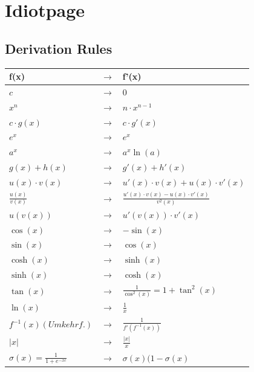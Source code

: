 \section{Idiotpage}
\subsection{Derivation Rules}

{\setlength{\extrarowheight}{4pt}
	\begin{tabular}{@{}lcl@{}}
		\textbf{f(x)} & $\rightarrow$ & \textbf{f'(x)} \\
		\toprule
		$c$ & $\rightarrow$ & $0$ \\
		$x^n$  & $\rightarrow$ & $n\cdot x^{n-1}$ \\
		$c\cdot g\left(x\right)$  & $\rightarrow$ & $c\cdot g'\left(x\right)$ \\
		$e^x$  & $\rightarrow$ & $e^x$ \\
		$a^x$ & $\rightarrow$ & $a^x\ln(a)$\\
		\midrule
		$g\left(x\right)+h\left(x\right)$  & $\rightarrow$ & $g'\left(x\right)+h'\left(x\right)$ \\
		$u\left(x\right)\cdot v\left(x\right)$  & $\rightarrow$ & $u'\left(x\right)\cdot v\left(x\right)+u\left(x\right)\cdot v'\left(x\right)$ \\ 
		$\frac{u\left(x\right)}{v\left(x\right)}$  & $\rightarrow$ & $\frac{u'\left(x\right)\cdot v\left(x\right)-u\left(x\right)\cdot v'\left(x\right)}{v^2\left(x\right)}$ \\
		$u\left(v\left(x\right)\right)$  & $\rightarrow$ & $u'\left(v\left(x\right)\right)\cdot v'\left(x\right)$ \\
		\midrule
		$\cos\left(x\right)$ & $\rightarrow$ & $-\sin(x)$ \\
		$\sin\left(x\right)$ & $\rightarrow$ & $\cos(x)$ \\	
		$\cosh\left(x\right)$ & $\rightarrow$ & $\sinh(x)$ \\
		$\sinh\left(x\right)$ & $\rightarrow$ & $\cosh(x)$ \\
		$\tan\left(x\right)$ & $\rightarrow$ & $\frac{1}{\cos^2(x)} = 1 + \tan^2(x)$ \\	
		$\ln\left(x\right)$ & $\rightarrow$ & $\frac{1}{x}$ \\
		$f^{-1}\left(x\right) {\scriptscriptstyle (Umkehrf.)}$  & $\rightarrow$ & $\frac{1}{f'(f^{-1}(x))}$ \\
		$\left|x\right|$ & $\rightarrow$ & $\frac{\left|x\right|}{x}$ \\
		\midrule
		$\sigma(x) = \frac{1}{1+ e^{-xc}}$ & $\rightarrow$ & $\sigma(x)(1 - \sigma(x)$\\
	\end{tabular}
}
